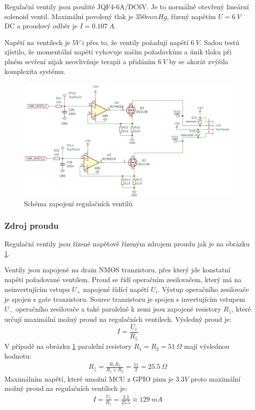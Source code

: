 Regulační ventily jsou použité JQF4-6A/DC6V. Je to normálně otevřený lineární solenoid ventil. Maximální povolený tlak je $350mmHg$, řízený napětím $U = 6 \ V$ DC a proudový odběr je $I = 0.107 \ A$.\par

Napětí na ventilech je $5V$ i přes to, že ventily požadují napětí $6 \ V$. Sadou testů zjístilo, že momentální napětí vyhovuje naším požadavkům a únik tlaku při plném sevření nijak neovlivňuje terapii a přidáním $6 \ V$ by se akorát zvýšila komplexita systému.

\begin{figure}[H]
    \includegraphics[width=1\linewidth]{pictures/var_valves.jpg}
    \caption{Schéma zapojení regulačních ventilů}
    \label{fig:variable_valve_driver}
\end{figure}

\subsubsection{Zdroj proudu}
Regulační ventily jsou řízené napěťově řízeným zdrojem proudu jak je na obrázku \ref{fig:variable_valve_driver}.\par
Ventily jsou napojené na drain NMOS tranzistoru, přes který jde konstatní napětí požadované ventilem. Proud se řídí operačním zesilovačem, který má na neinvertujícím vstupu $U_+$ napojené řídící napětí $U_i$. Výstup operačního zesilovače je spojen s gate tranzistoru. Source tranzistoru je spojen s invertujícím vstupem $U_-$ operačního zesilovače a také paralelně k zemi jsou zapojené resistory $R_{||}$, které určují maximální možný proud na regulačních ventilech. Výsledný proud je:
\begin{equation}
    \label{eq:current_source}
    I = \frac{U_i}{R_{||}}
\end{equation}
V případě na obrázku \ref{fig:variable_valve_driver} paralelní resistory $R_1 = R_2 = 51 \ \Omega$ mají výslednou hodnotu:
\begin{align*}
    R_{||} = \frac{R_1 R_2}{R_1 + R_2} = \frac{51}{2} = 25.5 \ \Omega
\end{align*}
Maximálním napětí, které umožní MCU z GPIO pinu je $3.3V$ proto maximální možný proud na regulačních ventilech je:
\begin{align*}
    I = \frac{U_i}{R_{||}} = \frac{3.3}{25.5} \approx 129 \ mA
\end{align*}

